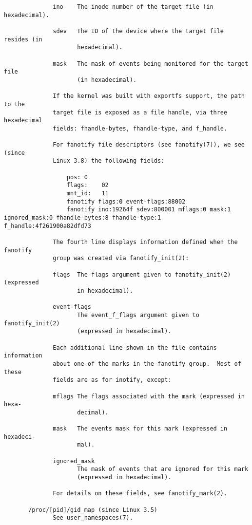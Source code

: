 \documentclass[]{article}
\begin{document}
\begin{verbatim}
              ino    The inode number of the target file (in hexadecimal).

              sdev   The ID of the device where the target file resides (in
                     hexadecimal).

              mask   The mask of events being monitored for the target file
                     (in hexadecimal).

              If the kernel was built with exportfs support, the path to the
              target file is exposed as a file handle, via three hexadecimal
              fields: fhandle-bytes, fhandle-type, and f_handle.

              For fanotify file descriptors (see fanotify(7)), we see (since
              Linux 3.8) the following fields:

                  pos: 0
                  flags:    02
                  mnt_id:   11
                  fanotify flags:0 event-flags:88002
                  fanotify ino:19264f sdev:800001 mflags:0 mask:1 ignored_mask:0 fhandle-bytes:8 fhandle-type:1 f_handle:4f261900a82dfd73

              The fourth line displays information defined when the fanotify
              group was created via fanotify_init(2):

              flags  The flags argument given to fanotify_init(2) (expressed
                     in hexadecimal).

              event-flags
                     The event_f_flags argument given to fanotify_init(2)
                     (expressed in hexadecimal).

              Each additional line shown in the file contains information
              about one of the marks in the fanotify group.  Most of these
              fields are as for inotify, except:

              mflags The flags associated with the mark (expressed in hexa‐
                     decimal).

              mask   The events mask for this mark (expressed in hexadeci‐
                     mal).

              ignored_mask
                     The mask of events that are ignored for this mark
                     (expressed in hexadecimal).

              For details on these fields, see fanotify_mark(2).

       /proc/[pid]/gid_map (since Linux 3.5)
              See user_namespaces(7).


\end{verbatim}
\end{document}
